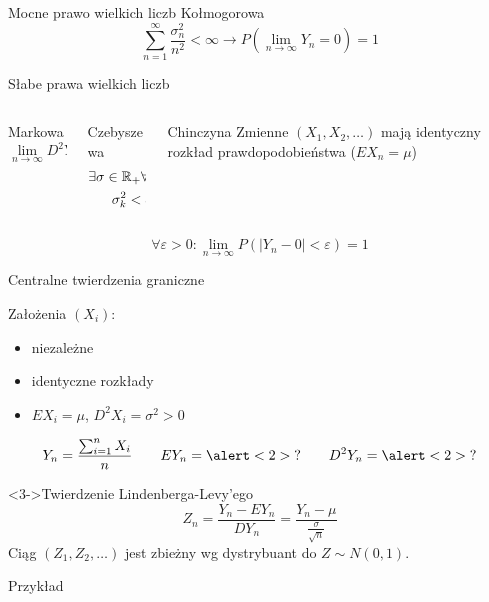\documentclass{mp}
\begin{document}
\begin{frame}{Mocne prawo wielkich liczb Kołmogorowa}
\[ \sum_{n=1}^\infty \frac{\sigma_n^2}{n^2}<\infty \to P(\lim_{n\to\infty} Y_n=0)=1 \]
\end{frame}
\begin{frame}{Słabe prawa wielkich liczb}
\begin{columns}[T]
\begin{column}{.30\textwidth}
{
\begin{block}{Markowa}
\[\lim_{n\to\infty} D^2Y_n=0 \]
\end{block}
}
\end{column}
\begin{column}{.30\textwidth}
{
\begin{block}{Czebyszewa}
\begin{gather*}
\exists \sigma\in\mathbb{R}_{+}\forall k\in\mathbb{N} \\
\sigma_k^2<\sigma^2
\end{gather*}
\end{block}
}
\end{column}
\begin{column}{.30\textwidth}
{
\begin{block}{Chinczyna}
Zmienne $(X_1, X_2, \ldots)$ mają identyczny rozkład prawdopodobieństwa
($EX_n=\mu$)
\end{block}
}
\end{column}
\end{columns}
\begin{block}{}
\[ \forall \varepsilon>0\colon \lim_{n\to\infty} P(\left|Y_n-0\right|<\varepsilon)=1 \]
\end{block}
\end{frame}
\begin{frame}{Centralne twierdzenia graniczne}
\begin{block}{Założenia}
$(X_i)$:
\begin{itemize}
\item niezależne
\item identyczne rozkłady
\item $EX_i=\mu$, $D^2X_i=\sigma^2>0$
\end{itemize}
{
\[ Y_n=\frac{\sum_{i=1}^n X_i}{n} \qquad EY_n=\alert<2>{?} \qquad D^2Y_n=\alert<2>{?} \]
}
\end{block}
\begin{block}<3->{Twierdzenie Lindenberga-Levy'ego}
\[ Z_n=\frac{Y_n-EY_n}{DY_n}=\frac{Y_n-\mu}{\frac{\sigma}{\sqrt{n}}} \]
Ciąg $(Z_1,Z_2,\ldots)$ jest zbieżny wg dystrybuant do $Z\sim N(0,1)$.
\end{block}
\end{frame}
\begin{frame}{Przykład}
\center
{}
\end{frame}
\end{document}
